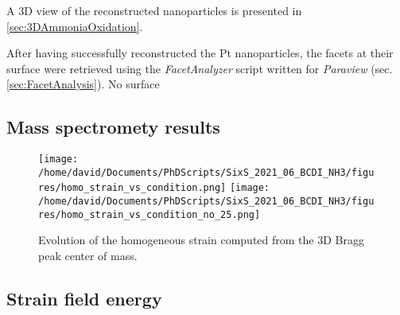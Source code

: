 A 3D view of the reconstructed nanoparticles is presented in \ref{sec:3DAmmoniaOxidation}.

After having successfully reconstructed the Pt nanoparticles, the facets at their surface were retrieved using the \textit{FacetAnalyzer} script written for \textit{Paraview} (sec. \ref{sec:FacetAnalysis}).
No surface

\subsection{Mass spectromety results}

\begin{figure}[!htb]
    \centering
    \texttt{[image: /home/david/Documents/PhDScripts/SixS\_2021\_06\_BCDI\_NH3/figures/homo\_strain\_vs\_condition.png]}
    \texttt{[image: /home/david/Documents/PhDScripts/SixS\_2021\_06\_BCDI\_NH3/figures/homo\_strain\_vs\_condition\_no\_25.png]}
    \caption{
        Evolution of the homogeneous strain computed from the 3D Bragg peak center of mass.
    }
    \label{fig:AmaterasuStrainSlices}
\end{figure}

\subsection{Strain field energy}
